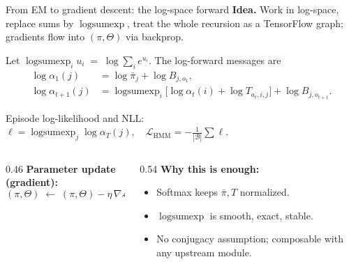 \documentclass[aspectratio=169,10pt]{beamer}
\DeclareMathOperator*{\lse}{logsumexp}
\newcommand{\Lcal}{\mathcal{L}}
\begin{document}
\begin{frame}{From EM to gradient descent: the log-space forward}
  \textbf{Idea.}\; Work in log-space, replace sums by $\lse$, treat the whole
  recursion as a TensorFlow graph; gradients flow into $(\pi,\Theta)$ via
  backprop.

  \vspace{0.2em}
  Let $\lse_i u_i \;=\; \log \sum_i e^{u_i}$. The log-forward messages are
  \begin{align*}
    \log\alpha_1(j) &= \log\bar\pi_j + \log B_{j,o_1},\\[-1pt]
    \log\alpha_{t+1}(j) &= \lse_i\bigl[\log\alpha_t(i) + \log T_{a_t,i,j}\bigr] + \log B_{j,o_{t+1}}.
  \end{align*}

  \vspace{-0.4em}
  Episode log-likelihood and NLL:\;
  $\displaystyle\ell = \lse_j \log\alpha_T(j),\quad
   \Lcal_{\text{HMM}} = -\tfrac{1}{|\mathcal{B}|}\!\sum \ell$.

  \vspace{0.3em}
  \begin{columns}[T,onlytextwidth]
    \begin{column}{0.46\textwidth}
      \textbf{Parameter update (gradient):}
      \[
        (\pi,\Theta) \;\leftarrow\; (\pi,\Theta) - \eta\,\nabla \Lcal_{\text{HMM}}.
      \]
    \end{column}
    \begin{column}{0.54\textwidth}
      \textbf{Why this is enough:}
      \begin{itemize}\small
        \item Softmax keeps $\bar\pi, T$ normalized.
        \item $\lse$ is smooth, exact, stable.
        \item No conjugacy assumption; composable with any upstream module.
      \end{itemize}
    \end{column}
  \end{columns}
\end{frame}
\end{document}

